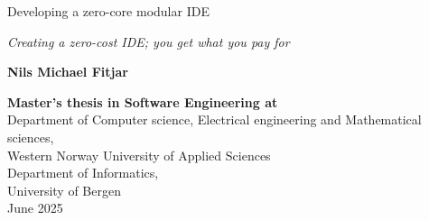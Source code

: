 
\begin{titlepage} %
  \selectfont
  \centering %


  \vspace{200pt}
  {\Huge Developing a zero-core modular IDE} \\ %
  \vspace{5pt}

  {\Large \textsl{Creating a zero-cost IDE; you get what you pay for}} %
  \vspace{50pt}


  \LARGE{\textbf{Nils Michael Fitjar}}\\ %

  \vfill %



  {\Large \textbf{Master's thesis in Software Engineering at} \\
  \vspace{10pt}
  Department of Computer science, Electrical engineering and Mathematical sciences, \\
  Western Norway University of Applied Sciences \\
  \vspace{10pt}
  Department of  Informatics, \\
  University of Bergen \\}
  \vspace{10pt}
  {\large June 2025} %


\end{titlepage}
